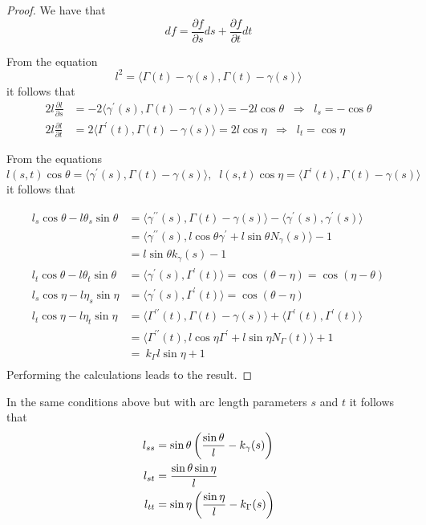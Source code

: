 \begin{proof} 
	We have that 
	\[  df=\frac{\partial f}{\partial s} ds +\frac{\partial f}{\partial t} dt\]
	
	From the equation \[ l^2= \langle \Gamma(t)-\gamma(s),\Gamma(t)-\gamma(s)\rangle \]
	it follows that
	\begin{align*}
	 2l \frac{\partial l}{ \partial s} &= -2\langle  \gamma^\prime(s), \Gamma(t)-\gamma(s)\rangle= -2l\cos\theta \;  \;    \Rightarrow\;  \;  l_s=-\cos\theta \\
	  2l \frac{\partial l}{ \partial t} &=  2\langle  \Gamma^\prime(t), \Gamma(t)-\gamma(s)\rangle=  2l\cos\eta \;  \;  \Rightarrow\;  \;   l_t=\cos \eta
	\end{align*}
	
	From the equations 
	\[  l(s,t)  \cos\theta =\langle  \gamma^\prime(s), \Gamma(t)-\gamma(s)\rangle,  \;\;   l(s,t)  \cos\eta   =\langle  \Gamma^\prime(t), \Gamma(t)-\gamma(s)\rangle   \]
	it follows that
	
		\begin{align*}
   l_s\cos\theta- l \theta_s\sin\theta   & =  \langle  \gamma^{\prime\prime}(s), \Gamma(t)-\gamma(s)\rangle- \langle  \gamma^\prime(s), \gamma^\prime(s)\rangle\\
	&  =  \langle \gamma^{\prime\prime}(s), l\cos \theta \gamma^\prime +l\sin\theta N_{\gamma}(s) \rangle-1\\
	 & =  l\sin\theta k_{\gamma}(s) -1\\
	  l_t\cos\theta- l \theta_t\sin\theta   & =  \langle  \gamma^{\prime }(s), \Gamma^\prime(t) \rangle =\cos( \theta-\eta)  = \cos( \eta-\theta) \\
%
	 l_s\cos\eta   -l \eta_s\sin\eta   & =  \langle  \gamma^{\prime }(s), \Gamma^\prime(t) \rangle =\cos( \theta-\eta)\\
	   l_t\cos\eta- l \eta_t\sin\eta  & =  \langle  \Gamma^{\prime\prime}(t), \Gamma(t)-\gamma(s)\rangle+ \langle  \Gamma^\prime(t), \Gamma^\prime(t)\rangle\\
	 & =  \langle \Gamma^{\prime\prime}(t), l\cos \eta \Gamma^\prime +l\sin\eta N_{ \Gamma} (t) \rangle+1 	\\
	  &  = \ k_{\Gamma}l \sin\eta +1 \\
%	 
	 	\end{align*}
	 	Performing the calculations leads to the result.   
\end{proof}

\begin{proposition}
	In the same conditions above but with arc length  parameters $s$ and $t$ it follows that
	\begin{equation}
	\aligned
	 l_{ss}&=  \sin\theta \left(\frac{\sin\theta}{l}-k_{\gamma}(s)\right)  \\
	 l_{st}&=  \frac {\sin\theta \sin\eta}{l}  \\
	 l_{tt}&=\sin\eta \left(\frac{\sin\eta}{l}-k_{\Gamma}(s)\right) 
		\endaligned
		\end{equation}
\end{proposition}

